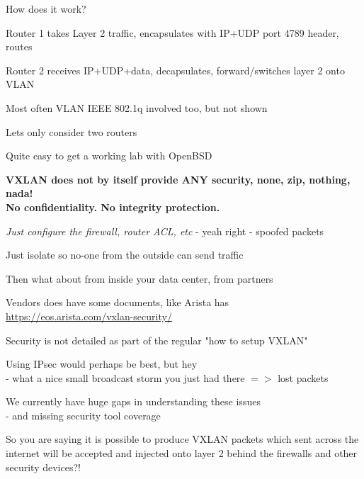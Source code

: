 \documentclass[16pt,landscape,a4paper,footrule]{foils}
\begin{document}


How does it work?

\begin{list2}
\item Router 1 takes Layer 2 traffic, encapsulates with IP+UDP port 4789 header, routes
\item Router 2 receives IP+UDP+data, decapsulates, forward/switches layer 2 onto VLAN
\item Most often VLAN IEEE 802.1q involved too, but not shown
\item Lets only consider two routers
\end{list2}

\vskip 5mm
\centerline{Quite easy to get a working lab with OpenBSD \smiley}


{\bf VXLAN does not by itself provide ANY security, none, zip, nothing, nada! \\
No confidentiality. No integrity protection.}



\begin{list2}
\item \emph{Just configure the firewall, router ACL, etc} - yeah right - spoofed packets
\item Just isolate so no-one from the outside can send traffic
\item Then what about from inside your data center, from partners
\item Vendors does have some documents, like Arista has\\ \url{https://eos.arista.com/vxlan-security/}
\item Security is not detailed as part of the regular "how to setup VXLAN"
\item Using IPsec would perhaps be best, but hey \\
- what a nice small broadcast storm you just had there $=>$ lost packets
\end{list2}


\vskip 1cm
We currently have huge gaps in understanding these issues\\
- and missing security tool coverage


So you are saying it is possible to produce VXLAN packets which sent across the internet will be accepted and injected onto layer 2 behind the firewalls and other security devices?!
\end{document}
